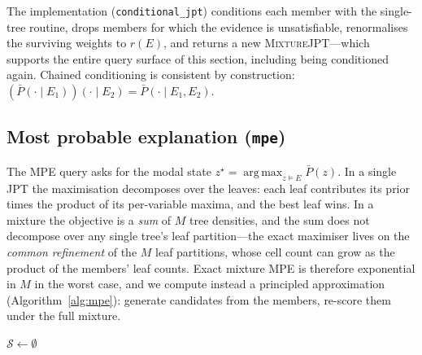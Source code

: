 \documentclass[11pt]{article}
\theoremstyle{plain}
\theoremstyle{definition}
\theoremstyle{remark}
\DeclareMathOperator*{\argmax}{arg\,max}
\newcommand{\mixture}{\textsc{MixtureJPT}}
\begin{document}
The implementation (\texttt{conditional\_jpt}) conditions each member
with the single-tree routine, drops members for which the evidence is
unsatisfiable, renormalises the surviving weights to $r(E)$, and returns
a new \mixture{}---which supports the entire query surface of this
section, including being conditioned again. Chained conditioning is
consistent by construction:
$(\bar P(\cdot\mid E_1))(\cdot\mid E_2)=\bar P(\cdot\mid E_1,E_2)$.

\subsection{Most probable explanation (\texttt{mpe})}
\label{sec:mpe}

The MPE query asks for the modal state
$z^\star=\argmax_{z\models E}\bar P(z)$. In a single JPT the maximisation
decomposes over the leaves: each leaf contributes its prior times the
product of its per-variable maxima, and the best leaf wins. In a mixture
the objective is a \emph{sum} of $M$ tree densities, and the sum does not
decompose over any single tree's leaf partition---the exact maximiser
lives on the \emph{common refinement} of the $M$ leaf partitions, whose
cell count can grow as the product of the members' leaf counts. Exact
mixture MPE is therefore exponential in $M$ in the worst case, and we
compute instead a principled approximation
(Algorithm~\ref{alg:mpe}): generate candidates from the members, re-score
them under the full mixture.

\begin{algorithm}[t]
\caption{Ensemble MPE by candidate generation and mixture re-scoring}
\label{alg:mpe}
$\mathcal{S}\leftarrow\emptyset$\;
\Return{$\argmax_{S}\text{score}(S)$ with its score}
\end{algorithm}
\end{document}
